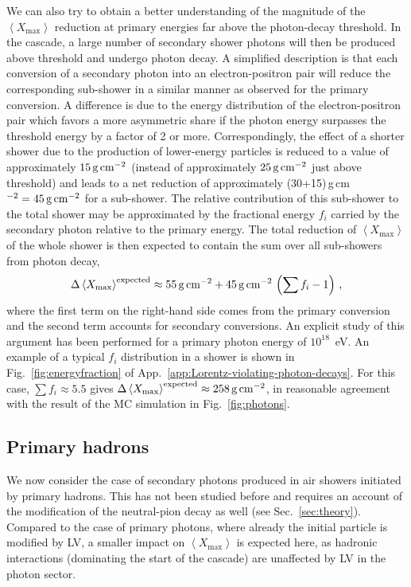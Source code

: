 \documentclass[aps,prd,preprint,longbibliography]{revtex4-1}
\begin{document}
We can also try to obtain a better understanding of
the magnitude of the $\left<X_\text{max}\right>$
reduction at primary energies far above the photon-decay threshold.
In the cascade, a large number of secondary shower photons
will then be produced above threshold and undergo photon decay.
A simplified description is that each conversion
of a secondary photon into an electron-positron pair will reduce the corresponding
sub-shower in a similar manner as observed for the primary conversion.
A difference is due to the energy distribution of the electron-positron pair
which favors a more asymmetric share if the photon energy surpasses
the threshold energy by a factor of 2 or more. Correspondingly,
the effect of a shorter shower due to the production of lower-energy
particles is reduced to a value of approximately $\unit[15]{g\,cm^{-2}}$
(instead of approximately $\unit[25]{g\,cm^{-2}}$ just above threshold)
and leads to a net reduction of approximately
(30+15)\,g\,cm$^{-2} = \unit[45]{g\,cm^{-2}}$ for a sub-shower.
The relative contribution of this sub-shower to the
total shower may be approximated by the fractional energy $f_i$ carried
by the secondary photon relative to the primary energy. The total
reduction of $\left<X_\text{max}\right>$ of the whole shower
is then expected to contain the sum over all sub-showers from photon decay,
\begin{equation}
\Delta \left<X_\text{max}\right>^\text{expected}
  \approx
  \unit[55]{g\,cm^{-2}}
  +  \unit[45]{g\,cm^{-2}}\, \left( \sum f_i - 1 \right)\,,
\label{eq:deltaxmaxexpected}
\end{equation}
where the first term on the right-hand side
comes from the primary conversion and the second
term accounts for secondary conversions.
An explicit study of this argument has been performed
for a primary photon energy of $10^{18}$~eV.
An example of a typical $f_i$ distribution in a shower is shown in
Fig.~\ref{fig:energyfraction} of App.~\ref{app:Lorentz-violating-photon-decays}.
For this case, $\sum f_i \approx 5.5$ gives
$\Delta \left<X_\text{max}\right>^\text{expected}
\approx \unit[258]{g\,cm^{-2}}$,
in reasonable agreement with the result of the MC simulation
in Fig.~\ref{fig:photons}.


\subsection{Primary hadrons}
\label{subsec:hadrons}

We now consider the case of secondary photons produced in air showers
initiated by primary hadrons. This has not been studied before and requires an account of the modification
of the neutral-pion decay as well (see Sec.~\ref{sec:theory}).
Compared to the case of primary photons, where already the initial particle
is modified by LV, a smaller impact on $\left<X_\text{max}\right>$
is expected here, as hadronic interactions (dominating the start of the
cascade) are unaffected by LV in the photon sector.
\end{document}

